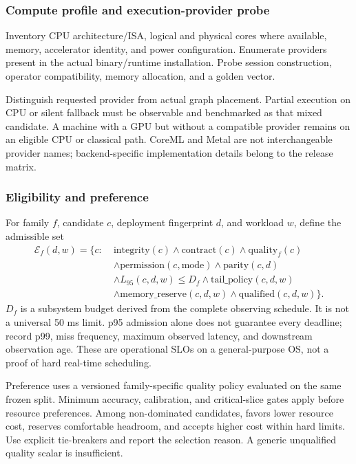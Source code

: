 \documentclass[11pt,a4paper]{article}
\newcommand{\code}[1]{\texttt{\detokenize{#1}}}
\begin{document}
\subsubsection{Compute profile and execution-provider probe}
Inventory CPU architecture/ISA, logical and physical cores where available,
memory, accelerator identity, and power configuration. Enumerate providers
present in the actual binary/runtime installation. Probe session construction,
operator compatibility, memory allocation, and a golden vector.

Distinguish requested provider from actual graph placement. Partial execution
on CPU or silent fallback must be observable and benchmarked as that mixed
candidate. A machine with a GPU but without a compatible provider remains on
an eligible CPU or classical path. CoreML and Metal are not interchangeable
provider names; backend-specific implementation details belong to the release
matrix.

\subsubsection{Eligibility and preference}
For family $f$, candidate $c$, deployment fingerprint $d$, and workload $w$,
define the admissible set
\begin{align*}
\mathcal E_f(d,w)=\{c:\;&\mathrm{integrity}(c)\land\mathrm{contract}(c)
 \land\mathrm{quality}_f(c)\\
 &\land\mathrm{permission}(c,\mathrm{mode})
 \land\mathrm{parity}(c,d)\\
 &\land L_{95}(c,d,w)\leq D_f
 \land\mathrm{tail\_policy}(c,d,w)\\
 &\land\mathrm{memory\_reserve}(c,d,w)
 \land\mathrm{qualified}(c,d,w)\}.
\end{align*}
$D_f$ is a subsystem budget derived from the complete observing schedule.
It is not a universal 50 ms limit. p95 admission alone does not guarantee every
deadline; record p99, miss frequency, maximum observed latency, and downstream
observation age. These are operational SLOs on a general-purpose OS, not a proof
of hard real-time scheduling.

Preference uses a versioned family-specific quality policy evaluated on the
same frozen split. Minimum accuracy, calibration, and critical-slice gates apply
before resource preferences. Among non-dominated candidates, \code{efficient}
favors lower resource cost, \code{balanced} reserves comfortable headroom, and
\code{quality} accepts higher cost within hard limits. Use explicit tie-breakers
and report the selection reason. A generic unqualified quality scalar is
insufficient.
\end{document}
